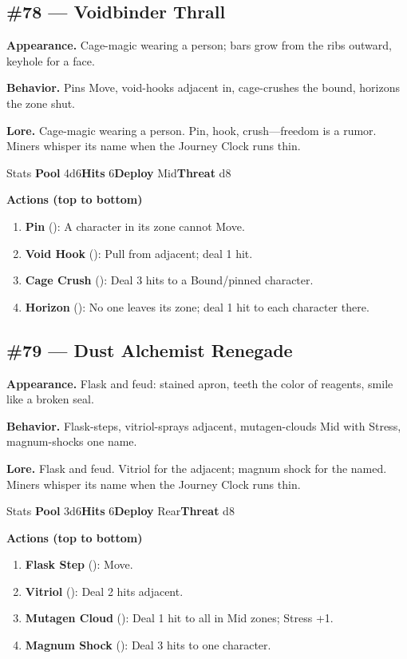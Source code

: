 \subsection*{\#78 --- Voidbinder Thrall}

\textbf{Appearance.} Cage-magic wearing a person; bars grow from the ribs outward, keyhole for a face.

\textbf{Behavior.} Pins Move, void-hooks adjacent in, cage-crushes the bound, horizons the zone shut.

\textbf{Lore.} Cage-magic wearing a person. Pin, hook, crush---freedom is a rumor. Miners whisper its name when the Journey Clock runs thin.

\begin{monsterentry}{Stats}
\textbf{Pool} 4d6\quad\textbf{Hits} 6\quad\textbf{Deploy} Mid\quad\textbf{Threat} d8

\textbf{Actions (top to bottom)}
\begin{enumerate}\setlength{\itemsep}{0.15em}\setlength{\parskip}{0pt}
  \item \textbf{Pin} (\easy): A character in its zone cannot Move.
  \item \textbf{Void Hook} (\medium): Pull from adjacent; deal 1 hit.
  \item \textbf{Cage Crush} (\hard): Deal 3 hits to a Bound/pinned character.
  \item \textbf{Horizon} (\hard): No one leaves its zone; deal 1 hit to each character there.
\end{enumerate}
\end{monsterentry}

\subsection*{\#79 --- Dust Alchemist Renegade}

\textbf{Appearance.} Flask and feud: stained apron, teeth the color of reagents, smile like a broken seal.

\textbf{Behavior.} Flask-steps, vitriol-sprays adjacent, mutagen-clouds Mid with Stress, magnum-shocks one name.

\textbf{Lore.} Flask and feud. Vitriol for the adjacent; magnum shock for the named. Miners whisper its name when the Journey Clock runs thin.

\begin{monsterentry}{Stats}
\textbf{Pool} 3d6\quad\textbf{Hits} 6\quad\textbf{Deploy} Rear\quad\textbf{Threat} d8

\textbf{Actions (top to bottom)}
\begin{enumerate}\setlength{\itemsep}{0.15em}\setlength{\parskip}{0pt}
  \item \textbf{Flask Step} (\easy): Move.
  \item \textbf{Vitriol} (\medium): Deal 2 hits adjacent.
  \item \textbf{Mutagen Cloud} (\hard): Deal 1 hit to all in Mid zones; Stress +1.
  \item \textbf{Magnum Shock} (\hard): Deal 3 hits to one character.
\end{enumerate}
\end{monsterentry}

